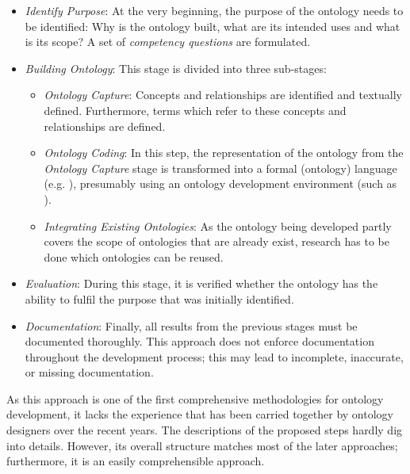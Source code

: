 \begin{itemize}
  \item \emph{Identify Purpose}: At the very beginning, the purpose of the ontology needs to be identified: Why is the ontology built, what are its intended uses and what is its scope? A set of \emph{competency questions} are formulated.
  
  \item \emph{Building Ontology}: This stage is divided into three sub-stages:
    \begin{itemize}
      \item \emph{Ontology Capture}: Concepts and relationships are identified and textually defined. Furthermore, terms which refer to these concepts and relationships are defined.
      
      \item \emph{Ontology Coding}: In this step, the representation of the ontology from the \emph{Ontology Capture} stage is transformed into a formal (ontology) language (e.g. ), presumably using an ontology development environment (such as \protege).
      
      \item \emph{Integrating Existing Ontologies}: As the ontology being developed partly covers the scope of ontologies that are already exist, research has to be done which ontologies can be reused.
    \end{itemize}
    
  \item \emph{Evaluation}: During this stage, it is verified whether the ontology has the ability to fulfil the purpose that was initially identified.
  
  \item \emph{Documentation}: Finally, all results from the previous stages must be documented thoroughly. This approach does not enforce documentation throughout the development process; this may lead to incomplete, inaccurate, or missing documentation.
    
\end{itemize}

As this approach is one of the first comprehensive methodologies for ontology development, it lacks the experience that has been carried together by ontology designers over the recent years. The descriptions of the proposed steps hardly dig into details. However, its overall structure matches most of the later approaches; furthermore, it is an easily comprehensible approach.

